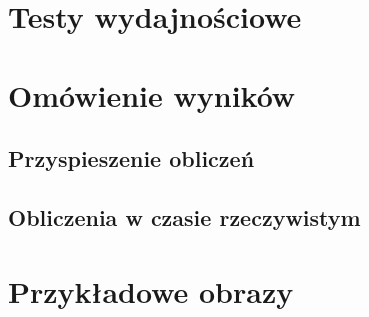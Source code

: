 \section{Testy wydajnościowe}
\section{Omówienie wyników}
	\subsection{Przyspieszenie obliczeń}
	\subsection{Obliczenia w czasie rzeczywistym}
\section{Przykładowe obrazy}